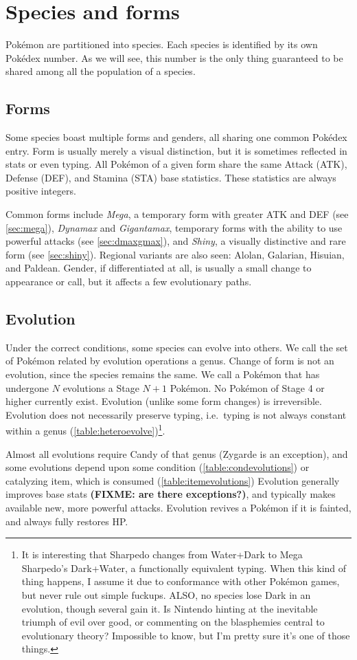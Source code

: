 \chapter{Species and forms}
\label{chap:species}
Pokémon are partitioned into species.
Each species is identified by its own Pokédex number.
As we will see, this number is the only thing guaranteed to be shared
 among all the population of a species.

\section{Forms}
\label{sec:forms}
Some species boast multiple forms and genders, all sharing one common Pokédex entry.
Form is usually merely a visual distinction, but it is sometimes reflected
 in stats or even typing.
All Pokémon of a given form share the same Attack (ATK), Defense (DEF), and
 Stamina (STA) base statistics.
These statistics are always positive integers.

Common forms include \textit{Mega}, a temporary form with greater ATK and DEF (see \autoref{sec:mega}),
  \textit{Dynamax} and \textit{Gigantamax}, temporary forms with the ability to use
  powerful attacks (see \autoref{sec:dmaxgmax}),
  and \textit{Shiny}, a visually distinctive and rare form (see \autoref{sec:shiny}).
Regional variants are also seen: Alolan, Galarian, Hisuian, and Paldean.
Gender, if differentiated at all, is usually a small change to
 appearance or call, but it affects a few evolutionary paths.

\section{Evolution}
\label{sec:evolution}
Under the correct conditions, some species can evolve into others.
We call the set of Pokémon related by evolution operations a genus.
Change of form is not an evolution, since the species remains the same.
We call a Pokémon that has undergone $N$ evolutions a Stage $N+1$ Pokémon.
No Pokémon of Stage 4 or higher currently exist.
Evolution (unlike some form changes) is irreversible.
Evolution does not necessarily preserve typing, i.e.\ typing is not always
  constant within a genus (\autoref{table:heteroevolve})\footnote{It is interesting
  that Sharpedo changes from Water+Dark to Mega Sharpedo's Dark+Water,
  a functionally equivalent typing. When this kind of thing happens,
  I assume it due to conformance with other Pokémon games, but never
  rule out simple fuckups. ALSO, no species lose Dark in an evolution,
  though several gain it. Is Nintendo hinting at the inevitable triumph of
  evil over good, or commenting on the blasphemies central to evolutionary theory?
  Impossible to know, but I'm pretty sure it's one of those things.}.

Almost all evolutions require Candy of that genus (Zygarde is an exception),
  and some evolutions depend upon some condition (\autoref{table:condevolutions})
  or catalyzing item, which is consumed (\autoref{table:itemevolutions})
Evolution generally improves base stats \textbf{(FIXME: are there exceptions?)},
  and typically makes available new, more powerful attacks.
Evolution revives a Pokémon if it is fainted, and always fully restores HP\@.


